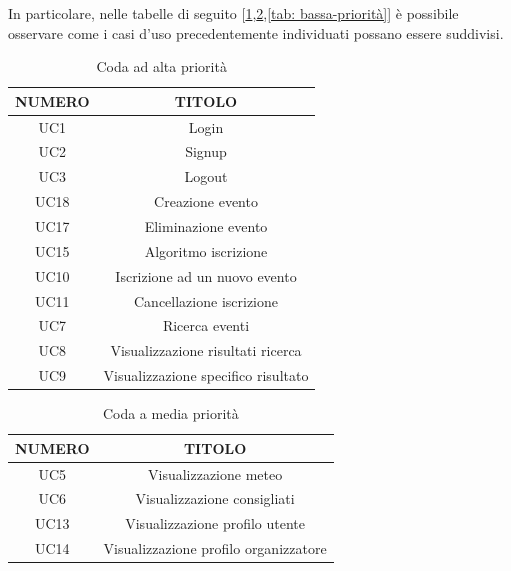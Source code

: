 In particolare, nelle tabelle di seguito [\ref*{tab: alta-priorità},\ref*{tab: media-priorità},\ref*{tab: bassa-priorità}] 
è possibile osservare come i casi d'uso precedentemente individuati possano essere suddivisi.
\clearpage

\begin{table}
\begin{center}
\begin{tabular}{ |c|c|}
 \hline
 \textbf{NUMERO}& \textbf{TITOLO} \\ \hline
 UC1& Login\\ \hline
 UC2& Signup\\ \hline
 UC3& Logout\\ \hline
 UC18& Creazione evento\\ \hline
 UC17& Eliminazione evento\\ \hline
 UC15& Algoritmo iscrizione\\ \hline
 UC10 & Iscrizione ad un nuovo evento\\ \hline
 UC11 & Cancellazione iscrizione\\ \hline
 UC7 & Ricerca eventi \\ \hline
 UC8 & Visualizzazione risultati ricerca \\ \hline
 UC9 & Visualizzazione specifico risultato \\ \hline
\end{tabular}
  \caption{Coda ad alta priorità}
  \label{tab: alta-priorità}
\end{center}
\end{table}

\begin{table}
\begin{center}
\begin{tabular}{ |c|c|}
 \hline
 \textbf{NUMERO}& \textbf{TITOLO} \\ \hline
 UC5& Visualizzazione meteo\\ \hline
 UC6& Visualizzazione consigliati\\ \hline
 UC13&Visualizzazione profilo utente\\ \hline
 UC14&Visualizzazione profilo organizzatore\\ \hline
\end{tabular}
  \caption{Coda a media priorità}
  \label{tab: media-priorità}
\end{center}
\end{table}

